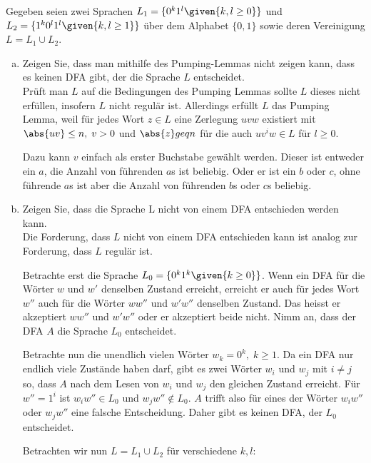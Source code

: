 Gegeben seien zwei Sprachen $L_1 = \{
0^{k}
 1^{l}
\given{k,l
\geq 0}\}$
und
$L_2 = \{1^k 0^l 1^l
\given{k,l \geq 1} \}$ über dem
 Alphabet $\{0, 1\}$
  sowie deren Vereinigung
  $L =
  L_1
  \cup
  L_2$.
\begin{enumerate}[a)]

\item Zeigen Sie, dass man mithilfe des Pumping-Lemmas nicht zeigen kann, dass es keinen DFA gibt, der die Sprache $L$ entscheidet.\\

Prüft man $L$ auf die Bedingungen des Pumping Lemmas sollte $L$ dieses nicht erfüllen, insofern $L$ nicht regulär ist. Allerdings erfüllt $L$ das Pumping Lemma, weil für jedes Wort $z \in L$ eine Zerlegung $uvw$ existiert mit $\abs{uv} \leq n, \; v>0$ und $\abs{z} geq n$ für die auch $uv^iw \in L$ für $l \geq 0$.

Dazu kann $v$ einfach als erster Buchstabe gewählt werden. Dieser ist entweder ein $a$, die Anzahl von führenden $a$s ist beliebig. Oder er ist ein $b$ oder $c$, ohne führende $a$s ist aber die Anzahl von führenden $b$s oder $c$s beliebig.




\item Zeigen Sie, dass die Sprache L nicht von einem DFA entschieden werden kann.\\

Die Forderung, dass $L$ nicht von einem DFA entschieden kann ist analog zur Forderung, dass $L$ regulär ist.

Betrachte erst die Sprache $L_0 = \{  0^k 1^k \given{k \geq 0} \}$. Wenn ein DFA für die Wörter $w$ und $w'$ denselben Zustand erreicht, erreicht er auch für jedes Wort $w''$ auch für die Wörter $ww''$ und $w'w''$ denselben Zustand. Das heisst er akzeptiert $ww''$ und $w'w''$ oder er akzeptiert beide nicht. Nimm an, dass der DFA $A$ die Sprache $L_0$ entscheidet.

Betrachte nun die unendlich vielen Wörter $w_k = 0^k, \; k \geq 1$. Da ein DFA nur endlich viele Zustände haben darf, gibt es zwei Wörter $w_i$ und $w_j$ mit $i \neq j$ so, dass $A$ nach dem Lesen von $w_i$ und $w_j$ den gleichen Zustand erreicht. Für $w'' = 1^i$ ist $w_i w'' \in L_0$ und $w_j w'' \notin L_0$. $A$ trifft also für eines der Wörter $w_i w''$ oder $w_j w''$ eine falsche Entscheidung. Daher gibt es keinen DFA, der $L_0$ entscheidet.

Betrachten wir nun $L = L_1 \cup L_2$ für verschiedene $k, l$:


\end{enumerate}
